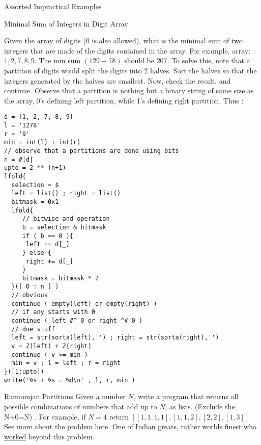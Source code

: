 \begin{section}{Assorted Impractical Examples}
\begin{subsection}{Minimal Sum of Integers in Digit Array}

Given the array of digits (0 is also allowed), what is the minimal sum of two integers 
that are made of the digits contained in the array. 
For example, array: $1, 2, 7, 8, 9$. The min sum $(129 + 78)$ should be $207$.
To solve this, note that a partition of digits would split the digits into 2 halves.
Sort the halves so that the integers generated by the halves are smallest.
Now, check the result, and continue. Observe that a partition 
is nothing but a binary string of same size as the array, 0's defining 
left partition, while 1's defining right partition. Thus :

\begin{center}\begin{minipage}{\linewidth}
\begin{lstlisting}[style=JexlStyle]
d = [1, 2, 7, 8, 9]
l = '1278'
r = '9' 
min = int(l) + int(r)  
// observe that a partitions are done using bits
n = #|d|
upto = 2 ** (n+1) 
lfold{
  selection = $ 
  left = list() ; right = list()
  bitmask = 0x1
  lfold{
     // bitwise and operation 
     b = selection & bitmask 
     if ( b == 0 ){ 
      left += d[_]   
     } else {
      right += d[_]   
     }
     bitmask = bitmask * 2 
  }([ 0 : n ] )
  // obvious 
  continue ( empty(left) or empty(right) ) 
  // if any starts with 0 
  continue ( left #^ 0 or right ^# 0 ) 
  // due stuff 
  left = str(sorta(left),'') ; right = str(sorta(right),'')
  v = Z(left) + Z(right)
  continue ( v >= min )
  min = v ; l = left ; r = right 
}([1:upto])
write('%s + %s = %d\n' , l, r, min )
\end{lstlisting}  
\end{minipage}\end{center}

\end{subsection}

\begin{subsection}{Ramanujan Partitions}
Given a number $N$, write a program that returns all possible combinations of numbers that add up to $N$, as lists. 
(Exclude the N+0=N) . For example, if $N=4$ return $[[1,1,1,1],[1,1,2],[2,2],[1,3]]$
See more about the problem \href{https://en.wikipedia.org/wiki/Partition\_(number\_theory)}{here}. 
One of Indian greats, rather worlds finest who \href{https://en.wikipedia.org/wiki/Ramanujan\%27s\_congruences}{worked} 
beyond this problem.


\end{subsection}
\end{section}
